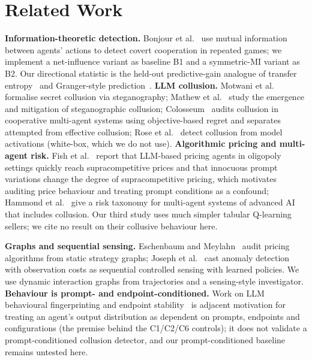\documentclass[11pt]{article}
\begin{document}
\section{Related Work}
\textbf{Information-theoretic detection.} Bonjour et al.~\cite{bonjour2022} use mutual information between agents' actions to detect covert cooperation in repeated games; we implement a net-influence variant as baseline B1 and a symmetric-MI variant as B2. Our directional statistic is the held-out predictive-gain analogue of transfer entropy~\cite{schreiber2000} and Granger-style prediction~\cite{granger1969}.
\textbf{LLM collusion.} Motwani et al.~\cite{motwani2024} formalise secret collusion via steganography; Mathew et al.~\cite{mathew2025} study the emergence and mitigation of steganographic collusion; Colosseum~\cite{nakamura2026} audits collusion in cooperative multi-agent systems using objective-based regret and separates attempted from effective collusion; Rose et al.~\cite{rose2026} detect collusion from model activations (white-box, which we do not use).
\textbf{Algorithmic pricing and multi-agent risk.} Fish et al.~\cite{fish2024} report that LLM-based pricing agents in oligopoly settings quickly reach supracompetitive prices and that innocuous prompt variations change the degree of supracompetitive pricing, which motivates auditing price behaviour and treating prompt conditions as a confound; Hammond et al.~\cite{hammond2025} give a risk taxonomy for multi-agent systems of advanced AI that includes collusion. Our third study uses much simpler tabular Q-learning sellers; we cite no result on their collusive behaviour here.

\textbf{Graphs and sequential sensing.} Eschenbaum and Meylahn~\cite{eschenbaum2026} audit pricing algorithms from static strategy graphs; Joseph et al.~\cite{joseph2024} cast anomaly detection with observation costs as sequential controlled sensing with learned policies. We use dynamic interaction graphs from trajectories and a sensing-style investigator.
\textbf{Behaviour is prompt- and endpoint-conditioned.} Work on LLM behavioural fingerprinting and endpoint stability~\cite{leshin2026,hu2026} is adjacent motivation for treating an agent's output distribution as dependent on prompts, endpoints and configurations (the premise behind the C1/C2/C6 controls); it does not validate a prompt-conditioned collusion detector, and our prompt-conditioned baseline remains untested here.
\end{document}
